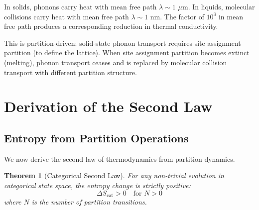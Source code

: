 \documentclass[twocolumn,10pt,aps,prd,superscriptaddress,nofootinbib]{revtex4-2}
\newtheorem{theorem}{Theorem}[section]
\theoremstyle{remark}
\newcommand{\Scat}{S_{\mathrm{cat}}}
\begin{document}
In solids, phonons carry heat with mean free path $\lambda \sim 1$ $\mu$m. In liquids, molecular collisions carry heat with mean free path $\lambda \sim 1$ nm. The factor of $10^3$ in mean free path produces a corresponding reduction in thermal conductivity.

This is partition-driven: solid-state phonon transport requires site assignment partition (to define the lattice). When site assignment partition becomes extinct (melting), phonon transport ceases and is replaced by molecular collision transport with different partition structure.


\section{Derivation of the Second Law}
\label{sec:second_law}

\subsection{Entropy from Partition Operations}

We now derive the second law of thermodynamics from partition dynamics.

\begin{theorem}[Categorical Second Law]
\label{thm:categorical_second_law}
For any non-trivial evolution in categorical state space, the entropy change is strictly positive:
\begin{equation}
\Delta \Scat > 0 \quad \text{for } N > 0
\label{eq:categorical_second_law}
\end{equation}
where $N$ is the number of partition transitions.
\end{theorem}
\end{document}
